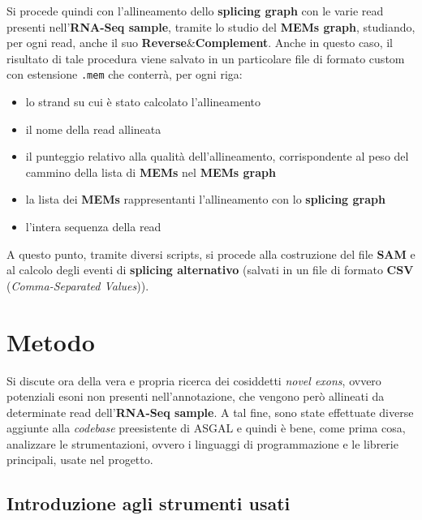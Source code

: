 \documentclass[a4paper,12pt, oneside]{book}
\begin{document}
Si procede quindi con l'allineamento dello \textbf{splicing graph}
con le varie read presenti nell'\textbf{RNA-Seq sample}, tramite lo studio del
\textbf{MEMs graph}, studiando, per ogni read, anche il suo
\textbf{Reverse}\&\textbf{Complement}. Anche in questo caso, il risultato di
tale procedura viene salvato in un particolare file di formato custom con
estensione \texttt{.mem} che conterrà, per ogni riga:
\begin{itemize}
  \item lo strand su cui è stato calcolato l'allineamento
  \item il nome della read allineata
  \item il punteggio relativo alla qualità dell'allineamento, corrispondente al
  peso del cammino della lista di \textbf{MEMs} nel \textbf{MEMs graph} 
  \item la lista dei \textbf{MEMs} rappresentanti l'allineamento con lo
  \textbf{splicing graph}
  \item l'intera sequenza della read
\end{itemize}
A questo punto, tramite diversi scripts, si procede alla costruzione del file
\textbf{SAM} e al calcolo degli eventi di \textbf{splicing alternativo} (salvati
in un file di formato \textbf{CSV} (\textit{Comma-Separated Values})).
\chapter{Metodo}
Si discute ora della vera e propria ricerca dei cosiddetti \textit{novel exons},
ovvero potenziali esoni non presenti nell'annotazione, che vengono però allineati
da determinate read dell'\textbf{RNA-Seq sample}. A tal fine, sono state
effettuate diverse aggiunte alla \textit{codebase} preesistente di ASGAL e
quindi è bene, come prima cosa, analizzare le strumentazioni, ovvero i linguaggi
di programmazione e le librerie principali, usate nel progetto.
\section{Introduzione agli strumenti usati}
\end{document}
